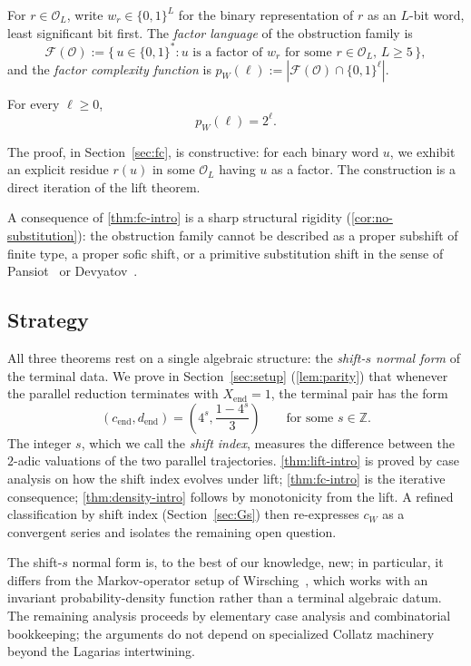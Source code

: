 \documentclass[11pt,reqno]{amsart}
\newcommand{\Z}{\mathbb{Z}}
\newcommand{\Obs}{\mathcal{O}}
\newcommand{\Fac}{\mathcal{F}}
\newcommand{\Xend}{X_{\mathrm{end}}}
\newcommand{\cend}{c_{\mathrm{end}}}
\newcommand{\dend}{d_{\mathrm{end}}}
\begin{document}
For $r \in \Obs_L$, write $w_r \in \{0,1\}^L$ for the binary representation
of $r$ as an $L$-bit word, least significant bit first. The
\emph{factor language} of the obstruction family is
\[
\Fac(\Obs) := \{\, u \in \{0,1\}^* : u \text{ is a factor of } w_r \text{ for some } r \in \Obs_L,\, L \ge 5 \,\},
\]
and the \emph{factor complexity function} is
$p_W(\ell) := |\Fac(\Obs) \cap \{0,1\}^\ell|$.

\begin{theorem}
\label{thm:fc-intro}
For every $\ell \ge 0$,
\[
p_W(\ell) = 2^\ell.
\]
\end{theorem}

The proof, in Section~\ref{sec:fc}, is constructive: for each binary word
$u$, we exhibit an explicit residue $r(u)$ in some $\Obs_L$ having $u$ as a
factor. The construction is a direct iteration of the lift theorem.

A consequence of \cref{thm:fc-intro} is a sharp structural rigidity
(\cref{cor:no-substitution}): the obstruction family cannot be
described as a proper subshift of finite type, a proper sofic shift, or a
primitive substitution shift in the sense of Pansiot~\cite{Pansiot1984} or
Devyatov~\cite{Devyatov2015}.

\subsection{Strategy}

All three theorems rest on a single algebraic structure: the \emph{shift-$s$
normal form} of the terminal data. We prove in Section~\ref{sec:setup}
(\cref{lem:parity}) that whenever the parallel reduction terminates
with $\Xend = 1$, the terminal pair has the form
\[
(\cend, \dend) = \left(4^s, \frac{1 - 4^s}{3}\right) \qquad \text{for some } s \in \Z.
\]
The integer $s$, which we call the \emph{shift index}, measures the
difference between the $2$-adic valuations of the two parallel trajectories.
\cref{thm:lift-intro} is proved by case analysis on how the shift
index evolves under lift; \cref{thm:fc-intro} is the iterative
consequence; \cref{thm:density-intro} follows by monotonicity
from the lift. A refined classification by shift index
(Section~\ref{sec:Gs}) then re-expresses $c_W$ as a convergent series and
isolates the remaining open question.

The shift-$s$ normal form is, to the best of our knowledge, new; in
particular, it differs from the Markov-operator setup of
Wirsching~\cite{Wirsching1998}, which works with an invariant
probability-density function rather than a terminal algebraic datum. The
remaining analysis proceeds by elementary case analysis and combinatorial
bookkeeping; the arguments do not depend on specialized Collatz machinery
beyond the Lagarias intertwining.
\end{document}
